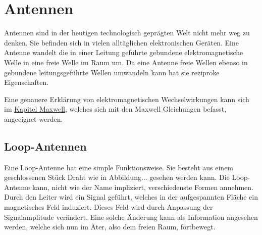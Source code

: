 %
%
% 
%
%

\section{Antennen\label{antennen:antennenAllgemein}}

Antennen sind in der heutigen technologisch geprägten Welt nicht mehr weg zu denken. Sie befinden sich in vielen alltäglichen elektronischen Geräten. Eine Antenne wandelt die in einer Leitung geführte gebundene elektromagnetische Welle in eine freie Welle im Raum um. Da eine Antenne freie Wellen ebenso in gebundene leitungsgeführte Wellen umwandeln kann hat sie reziproke Eigenschaften.

Eine genauere Erklärung von elektromagnetischen Wechselwirkungen kann sich im \href{chapter:maxwell}{Kapitel Maxwell}, welches sich mit den Maxwell Gleichungen befasst, angeeignet werden. 
\subsection{Loop-Antennen\label{antennen:antennenAllgemein_loop}}
Eine Loop-Antenne hat eine simple Funktionsweise. Sie besteht aus einem geschlossenen Stück Draht wie in Abbildung... gesehen werden kann. Die Loop-Antenne kann, nicht wie der Name impliziert, verschiedenste Formen annehmen. Durch den Leiter wird ein Signal geführt, welches in der aufgespannten Fläche ein magnetisches Feld induziert. Dieses Feld wird durch Anpassung der Signalamplitude verändert. Eine solche Änderung kann als Information angesehen werden, welche sich nun im Äter, also dem freien Raum, fortbewegt.

